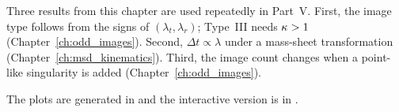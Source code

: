 \begin{bridge}
Three results from this chapter are used repeatedly in Part~V.  First, the
image type follows from the signs of $(\lambda_t,\lambda_r)$; Type~III needs
$\kappa>1$ (Chapter~\ref{ch:odd_images}).  Second, $\Delta t\propto\lambda$
under a mass-sheet transformation (Chapter~\ref{ch:msd_kinematics}).  Third,
the image count changes when a point-like singularity is added
(Chapter~\ref{ch:odd_images}).
\end{bridge}

\noindent
The plots are generated in
and the interactive version is in
.

